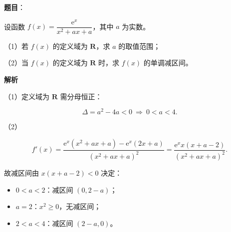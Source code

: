 \begin{answer}

\textbf{题目}：

设函数 $f(x)=\dfrac{\mathrm e^x}{x^2+ax+a}$，其中 $a$ 为实数。

（1）若 $f(x)$ 的定义域为 $\mathbf R$，求 $a$ 的取值范围；

（2）当 $f(x)$ 的定义域为 $\mathbf R$ 时，求 $f(x)$ 的单调减区间。

\textbf{解析}

（1）定义域为 $\mathbf R$ 需分母恒正：

\nopagebreak[4]
\[\Delta=a^2-4a<0\ \Rightarrow\ 0<a<4.\]

（2）

\nopagebreak[4]
\[f'(x)=\frac{\mathrm e^x(x^2+ax+a)-\mathrm e^x(2x+a)}{(x^2+ax+a)^2}
=\frac{\mathrm e^x x(x+a-2)}{(x^2+ax+a)^2}.\]

故减区间由 $x(x+a-2)<0$ 决定：

\begin{itemize}
\item $0<a<2$：减区间 $(0,2-a)$；
\item $a=2$：$x^2\ge0$，无减区间；
\item $2<a<4$：减区间 $(2-a,0)$。
\end{itemize}


\end{answer}
